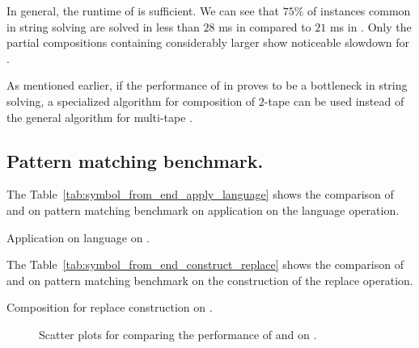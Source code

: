 In general, the runtime of \mata is sufficient.
We can see that $75 \%$ of instances common in string solving are solved in less than $28$ ms in \mata compared to $21$ ms in \mona.
Only the partial compositions containing considerably larger \nfts show noticeable slowdown for \mata.

As mentioned earlier, if the performance of \nfts in \mata proves to be a bottleneck in string solving, a specialized algorithm for composition of $2$-tape \nfts can be used instead of the general algorithm for multi-tape \nfts.

\subsection{Pattern matching benchmark.}

The Table~\ref{tab:symbol_from_end_apply_language} shows the comparison of \mata and \mona on pattern matching benchmark \symbolFromEnd on application on the language operation.

\begin{table}[ht]
  \centering
  
  \caption{
    Application on language on \symbolFromEnd.
  }
  \label{tab:symbol_from_end_apply_language}
\end{table}

The Table~\ref{tab:symbol_from_end_construct_replace} shows the comparison of \mata and \mona on pattern matching benchmark \symbolFromEnd on the construction of the replace \nft operation.

\begin{table}[ht]
  \centering
  
  \caption{
    Composition for replace construction on \symbolFromEnd.
  }
  \label{tab:symbol_from_end_construct_replace}
\end{table}

\begin{figure}[ht]
    \centering
    \quad
    \caption{
      Scatter plots for comparing the performance of \mata and \mona on \symbolFromEnd.
    }
    \label{fig:symbol_from_end}%
\end{figure}

